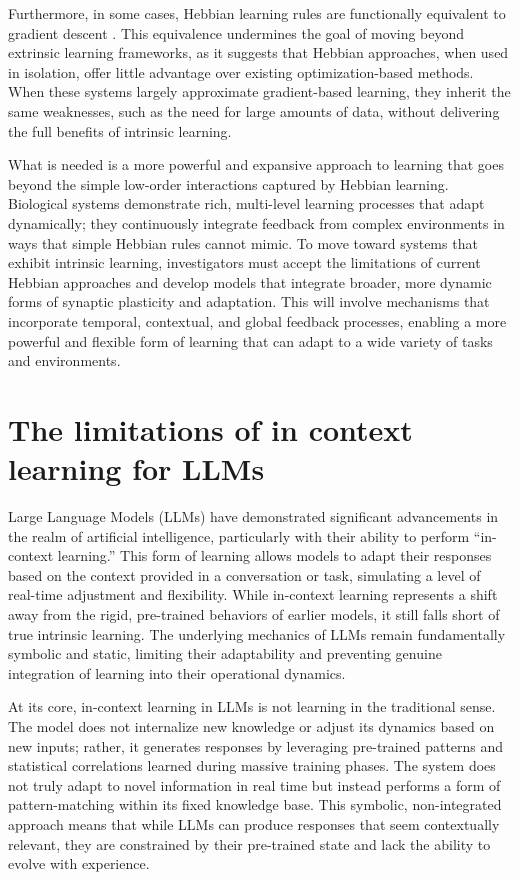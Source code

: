 \documentclass{article}
\begin{document}
Furthermore, in some cases, Hebbian learning rules are functionally
equivalent to gradient descent \cite{xie2003equivalence}. This equivalence
undermines the goal of moving beyond extrinsic learning frameworks,
as it suggests that Hebbian approaches, when used in isolation, offer
little advantage over existing optimization-based methods. When these
systems largely approximate gradient-based learning, they inherit the
same weaknesses, such as the need for large amounts of data, without
delivering the full benefits of intrinsic learning.

What is needed is a more powerful and expansive approach to learning that
goes beyond the simple low-order interactions captured by Hebbian
learning. Biological systems demonstrate rich, multi-level learning
processes that adapt dynamically; they continuously integrate feedback from
complex environments in ways that simple Hebbian rules cannot mimic. To
move toward systems that exhibit intrinsic learning, investigators must
accept the limitations of current Hebbian approaches and develop models that integrate
broader, more dynamic forms of synaptic plasticity and adaptation. This
will involve mechanisms that incorporate temporal, contextual, and
global feedback processes, enabling a more powerful and flexible form
of learning that can adapt to a wide variety of tasks and environments.


\section{The limitations of in context learning for LLMs}

Large Language Models (LLMs) have demonstrated significant advancements
in the realm of artificial intelligence, particularly with their ability
to perform ``in-context learning.'' \cite{dong2024surveyincontextlearning}
This form of learning allows models to adapt their responses based on
the context provided in a conversation or task, simulating a level
of real-time adjustment and flexibility. While in-context learning
represents a shift away from the rigid, pre-trained behaviors of earlier
models, it still falls short of true intrinsic learning. The underlying
mechanics of LLMs remain fundamentally symbolic and static, limiting
their adaptability and preventing genuine integration of learning into
their operational dynamics.

At its core, in-context learning in LLMs is not learning in the
traditional sense. The model does not internalize new knowledge or
adjust its dynamics based on new inputs; rather, it generates responses
by leveraging pre-trained patterns and statistical correlations learned
during massive training phases. The system does not truly adapt to novel
information in real time but instead performs a form of pattern-matching
within its fixed knowledge base. This symbolic, non-integrated approach
means that while LLMs can produce responses that seem contextually
relevant, they are constrained by their pre-trained state
and lack the ability to evolve with experience.
\end{document}
